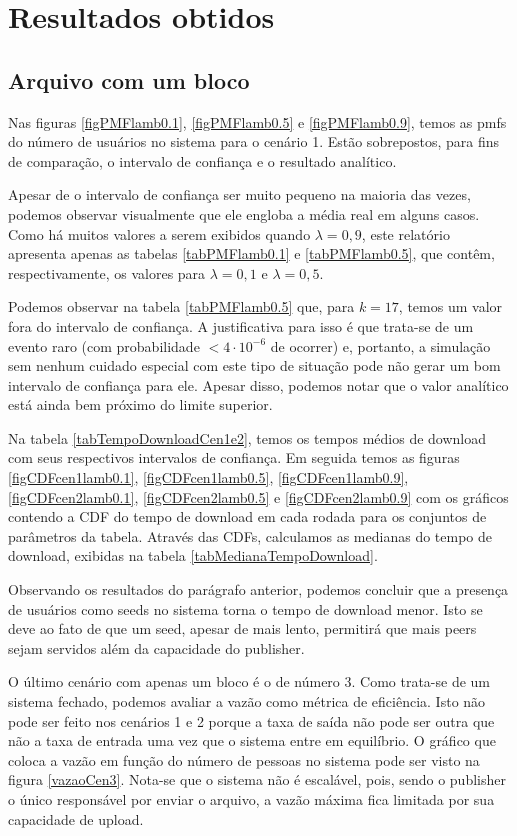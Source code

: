 \documentclass[a4paper,10pt]{article}
\begin{document}
\section{Resultados obtidos}

\subsection{Arquivo com um bloco}

Nas figuras \ref{figPMFlamb0.1}, \ref{figPMFlamb0.5} e \ref{figPMFlamb0.9}, temos as pmfs do número de usuários no sistema para o cenário 1. Estão sobrepostos, para fins de comparação, o intervalo de confiança e o resultado analítico.

Apesar de o intervalo de confiança ser muito pequeno na maioria das vezes, podemos observar visualmente que ele engloba a média real em alguns casos. Como há muitos valores a serem exibidos quando $\lambda = 0,9$, este relatório apresenta apenas as tabelas \ref{tabPMFlamb0.1} e \ref{tabPMFlamb0.5}, que contêm, respectivamente, os valores para $\lambda = 0,1$ e $\lambda = 0,5$.

Podemos observar na tabela \ref{tabPMFlamb0.5} que, para $k = 17$, temos um valor fora do intervalo de confiança. A justificativa para isso é que trata-se de um evento raro (com probabilidade $< 4 \cdot 10^{-6}$ de ocorrer) e, portanto, a simulação sem nenhum cuidado especial com este tipo de situação pode não gerar um bom intervalo de confiança para ele. Apesar disso, podemos notar que o valor analítico está ainda bem próximo do limite superior.

Na tabela \ref{tabTempoDownloadCen1e2}, temos os tempos médios de download com seus respectivos intervalos de confiança. Em seguida temos as figuras \ref{figCDFcen1lamb0.1}, \ref{figCDFcen1lamb0.5}, \ref{figCDFcen1lamb0.9}, \ref{figCDFcen2lamb0.1}, \ref{figCDFcen2lamb0.5} e \ref{figCDFcen2lamb0.9} com os gráficos contendo a CDF do tempo de download em cada rodada para os conjuntos de parâmetros da tabela. Através das CDFs, calculamos as medianas do tempo de download, exibidas na tabela \ref{tabMedianaTempoDownload}.

Observando os resultados do parágrafo anterior, podemos concluir que a presença de usuários como seeds no sistema torna o tempo de download menor. Isto se deve ao fato de que um seed, apesar de mais lento, permitirá que mais peers sejam servidos além da capacidade do publisher.

O último cenário com apenas um bloco é o de número 3. Como trata-se de um sistema fechado, podemos avaliar a vazão como métrica de eficiência. Isto não pode ser feito nos cenários 1 e 2 porque a taxa de saída não pode ser outra que não a taxa de entrada uma vez que o sistema entre em equilíbrio. O gráfico que coloca a vazão em função do número de pessoas no sistema pode ser visto na figura \ref{vazaoCen3}. Nota-se que o sistema não é escalável, pois, sendo o publisher o único responsável por enviar o arquivo, a vazão máxima fica limitada por sua capacidade de upload.
\end{document}
